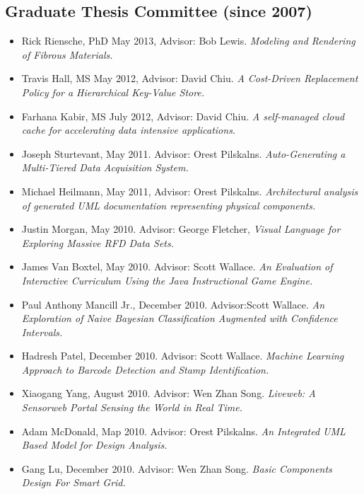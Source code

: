\documentclass[10pt]{article}
\begin{document}
\subsection*{Graduate Thesis Committee (since 2007)}
  \begin{itemize}
  \item Rick Riensche, PhD May 2013, Advisor: Bob Lewis. {\em Modeling and Rendering of
      Fibrous Materials.}
  \item Travis Hall, MS May 2012, Advisor: David Chiu. {\em A Cost-Driven 
      Replacement Policy for a Hierarchical Key-Value Store.}
  \item Farhana Kabir, MS July 2012, Advisor: David Chiu. {\em A self-managed cloud cache 
      for accelerating data intensive applications.}
  \item Joseph Sturtevant, May 2011. Advisor: Orest Pilskalns. {\em Auto-Generating 
      a Multi-Tiered Data Acquisition System.}
  \item Michael Heilmann, May 2011, Advisor: Orest Pilskalns. {\em Architectural analysis of 
      generated UML documentation representing physical components.}
  \item Justin Morgan, May 2010. Advisor: George Fletcher, {\em Visual Language for 
      Exploring Massive RFD Data Sets.}
  \item James Van Boxtel, May 2010. Advisor: Scott Wallace. {\em An Evaluation of 
      Interactive Curriculum Using the Java Instructional Game Engine.}
  \item Paul Anthony Mancill Jr., December 2010. Advisor:Scott Wallace. {\em An Exploration 
     of Naive Bayesian Classification Augmented with Confidence Intervals.}
  \item Hadresh Patel, December 2010. Advisor: Scott Wallace. {\em Machine Learning Approach 
      to Barcode Detection and Stamp Identification.} 
  \item Xiaogang Yang, August 2010. Advisor: Wen Zhan Song. {\em Liveweb: A Sensorweb Portal 
      Sensing the World in Real Time.}
  \item Adam McDonald, Map 2010. Advisor: Orest Pilskalns. {\em An Integrated UML Based 
      Model for Design Analysis.}
  \item Gang Lu, December 2010. Advisor: Wen Zhan Song. {\em Basic Components Design For Smart Grid.}

\end{itemize}
\end{document}

